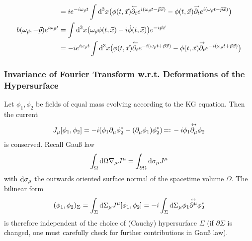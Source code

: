\begin{subequations}
\begin{align}
                                                                & ={i} e^{-{i}\omega_{\vec{p}}t}\int\text{d}^3x\big(\phi(t,\vec{x})\overset{\leftarrow}{\partial_t}e^{{i}(\omega_{\vec{p}}t-\vec{p}\vec{x})}-\phi(t,\vec{x})\overset{\rightarrow}{\partial_t}e^{{i}(\omega_{\vec{p}}t-\vec{p}\vec{x})}\big)   \\
        b(\omega_{\vec{p}},-\vec{p})e^{{i}\omega_{\vec{p}}t} & =\int\text{d}^3x\big(\omega_{\vec{p}}\phi(t,\vec{x})-{i}\dot{\phi}(t,\vec{x})\big)e^{-{i}\vec{p}\vec{x}}                                                                                                                                          \\
                                                                & =-{i} e^{{i}\omega_{\vec{p}}t}\int\text{d}^3x\big(\phi(t,\vec{x})\overset{\leftarrow}{\partial_t}e^{-{i}(\omega_{\vec{p}}t+\vec{p}\vec{x})}-\phi(t,\vec{x})\overset{\rightarrow}{\partial_t}e^{-{i}(\omega_{\vec{p}}t+\vec{p}\vec{x})}\big)
    \end{align}
\end{subequations}

\subsubsection{Invariance of Fourier Transform w.r.t. Deformations of the Hypersurface}
\label{subsec:FourierDeformHypersurface}

Let $\phi_1,\phi_2$ be fields of equal mass evolving according to the KG equation. Then the current
\begin{equation}
    J_\mu[\phi_1,\phi_2]=-{i}(\phi_1\partial_\mu\phi_2^*-(\partial_\mu\phi_1)\phi_2^*){\,=\vcentcolon\,}-{i}\phi_1\overset{\leftrightarrow}{\partial_\mu}\phi_2
\end{equation}
is conserved. Recall Gauß law
\begin{equation}
    \int_\Omega\text{d} \Omega\nabla_\mu J^\mu=\int_{\partial\Omega}\text{d}\sigma_\mu J^\mu
\end{equation}
with $\text{d}\sigma_\mu$ the outwards oriented surface normal of the spacetime volume $\Omega$. The bilinear form
\begin{equation}
    (\phi_1,\phi_2)_\Sigma=\int_\Sigma\text{d}\Sigma_\mu J^\mu[\phi_1,\phi_2]=-{i}\int_\Sigma\text{d}\Sigma_\mu \phi_1\overset{\leftrightarrow}{\partial^\mu}\phi_2^*
\end{equation}
is therefore independent of the choice of (Cauchy) hypersurface $\Sigma$ (if $\partial\Sigma$ is changed, one must carefully check for further contributions in Gauß law).

